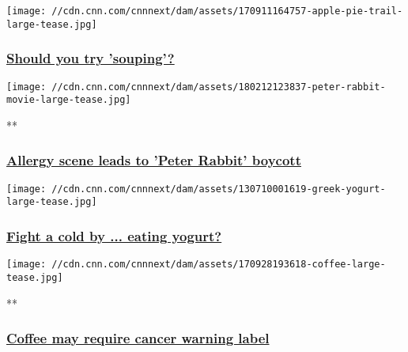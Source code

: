 \href{/2018/01/26/health/soup-food-drayer/index.html}{}

\texttt{[image: //cdn.cnn.com/cnnnext/dam/assets/170911164757-apple-pie-trail-large-tease.jpg]}

\hypertarget{should-you-try-souping}{%
\subsubsection{\texorpdfstring{\href{/2018/01/26/health/soup-food-drayer/index.html}{Should
you try
'souping'?}}{Should you try 'souping'?}}\label{should-you-try-souping}}

\href{/videos/health/2018/02/12/peter-rabbit-food-allergy-controversy-orig-vstop-bdk.cnn}{}

\texttt{[image: //cdn.cnn.com/cnnnext/dam/assets/180212123837-peter-rabbit-movie-large-tease.jpg]}

**

\hypertarget{allergy-scene-leads-to-peter-rabbit-boycott}{%
\subsubsection{\texorpdfstring{\href{/videos/health/2018/02/12/peter-rabbit-food-allergy-controversy-orig-vstop-bdk.cnn}{Allergy
scene leads to 'Peter Rabbit'
boycott}}{Allergy scene leads to 'Peter Rabbit' boycott}}\label{allergy-scene-leads-to-peter-rabbit-boycott}}

\href{/2018/01/19/health/fight-cold-yogurt-food-drayer/index.html}{}

\texttt{[image: //cdn.cnn.com/cnnnext/dam/assets/130710001619-greek-yogurt-large-tease.jpg]}

\hypertarget{fight-a-cold-by--eating-yogurt}{%
\subsubsection{\texorpdfstring{\href{/2018/01/19/health/fight-cold-yogurt-food-drayer/index.html}{Fight
a cold by ... eating
yogurt?}}{Fight a cold by ... eating yogurt?}}\label{fight-a-cold-by--eating-yogurt}}

\href{/videos/health/2018/02/01/coffee-cancer-warning-california.hln}{}

\texttt{[image: //cdn.cnn.com/cnnnext/dam/assets/170928193618-coffee-large-tease.jpg]}

**

\hypertarget{coffee-may-require-cancer-warning-label}{%
\subsubsection{\texorpdfstring{\href{/videos/health/2018/02/01/coffee-cancer-warning-california.hln}{Coffee
may require cancer warning
label}}{Coffee may require cancer warning label}}\label{coffee-may-require-cancer-warning-label}}

